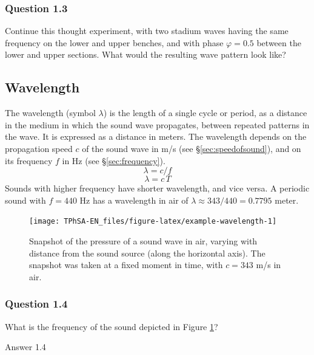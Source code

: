 \documentclass[
]{book}
\begin{document}
\label{questions-phase}
\subsubsection*{Question 1.3}\label{question-1.3}

Continue this thought experiment, with two stadium waves having the same frequency on the lower and upper benches, and with phase \(\varphi=0.5\) between the lower and upper sections. What would the resulting wave pattern look like?

\subsection{Wavelength}\label{sec:wavelength}

The wavelength (symbol \(\lambda\)) is the length of a single cycle or period, as a distance in the medium in which the sound wave propagates, between repeated patterns in the wave. It is expressed as a distance in meters. The wavelength depends on the propagation speed \(c\) of the sound wave in m/s (see §\ref{sec:speedofsound}), and on its frequency \(f\) in Hz (see §\ref{sec:frequency}).
\[\lambda = c / f\]
\[\lambda = c \, T\]
Sounds with higher frequency have shorter wavelength, and vice versa. A periodic sound with \(f=440\) Hz has a wavelength in air of \(\lambda \approx 343/440 = 0.7795\) meter.

\begin{figure}

{\centering \texttt{[image: TPhSA-EN\_files/figure-latex/example-wavelength-1]} 

}

\caption{Snapshot of the pressure of a sound wave in air, varying with distance from the sound source (along the horizontal axis). The snapshot was taken at a fixed moment in time, with $c=343$ m/s in air. }\label{fig:example-wavelength}
\end{figure}

\label{questions-wavelength}
\subsubsection*{Question 1.4}\label{question-1.4}

What is the frequency of the sound depicted in Figure \ref{fig:example-wavelength}?

Answer 1.4
\end{document}
